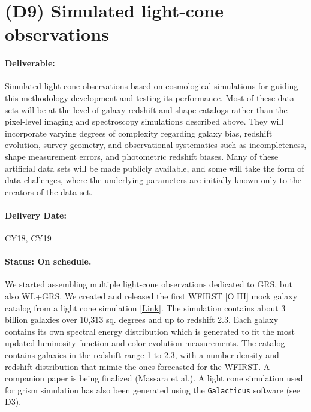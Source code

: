 \section*{(D9) Simulated light-cone observations}

\paragraph*{Deliverable:} Simulated light-cone observations based on
cosmological simulations for guiding this methodology development and testing
its performance. Most of these data sets will be at the level of galaxy redshift
and shape catalogs rather than the pixel-level imaging and spectroscopy
simulations described above.  They will incorporate varying degrees of
complexity regarding galaxy bias, redshift evolution, survey geometry, and
observational systematics such as incompleteness, shape measurement errors, and
photometric redshift biases.  Many of these artificial data sets will be made
publicly available, and some will take the form of data challenges, where the
underlying parameters are initially known only to the creators of the data set.

\paragraph*{Delivery Date:} CY18, CY19

\paragraph*{Status: On schedule.} We started assembling multiple light-cone observations dedicated to GRS, but also WL+GRS. We created and released the first WFIRST [O III] mock galaxy catalog from a light cone simulation \href{http://www.wfirst-hls-cosmology.org/products/}{[Link]}. The simulation contains about 3 billion galaxies over 10,313 sq. degrees and up to redshift 2.3. Each galaxy contains its own spectral energy distribution which is generated to fit the most updated luminosity function and color evolution measurements. The catalog contains galaxies in the redshift range 1 to 2.3, with a number density and redshift distribution that mimic the ones forecasted for the WFIRST. A companion paper is being finalized (Massara et al.). A light cone simulation used for grism simulation has also been generated using the \texttt{Galacticus} software (see D3).


